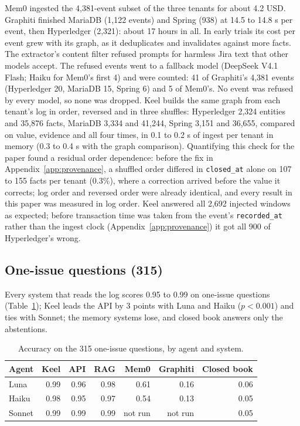 \documentclass{article}
\newcommand{\code}[1]{\texttt{#1}}
\begin{document}
Mem0 ingested the 4,381-event subset of the three tenants for about 4.2 USD. Graphiti finished MariaDB (1,122 events) and Spring (938) at 14.5 to 14.8 s per event, then Hyperledger (2,321): about 17 hours in all. In early trials its cost per event grew with its graph, as it deduplicates and invalidates against more facts. The extractor's content filter refused prompts for harmless Jira text that other models accept. The refused events went to a fallback model (DeepSeek V4.1 Flash; Haiku for Mem0's first 4) and were counted: 41 of Graphiti's 4,381 events (Hyperledger 20, MariaDB 15, Spring 6) and 5 of Mem0's. No event was refused by every model, so none was dropped. Keel builds the same graph from each tenant's log in order, reversed and in three shuffles: Hyperledger 2,324 entities and 35,876 facts, MariaDB 3,334 and 41,244, Spring 3,151 and 36,655, compared on value, evidence and all four times, in 0.1 to 0.2 s of ingest per tenant in memory (0.3 to 0.4 s with the graph comparison). Quantifying this check for the paper found a residual order dependence: before the fix in Appendix~\ref{app:provenance}, a shuffled order differed in \code{closed\_at} alone on 107 to 155 facts per tenant (0.3\%), where a correction arrived before the value it corrects; log order and reversed order were already identical, and every result in this paper was measured in log order. Keel answered all 2,692 injected windows as expected; before transaction time was taken from the event's \code{recorded\_at} rather than the ingest clock (Appendix~\ref{app:provenance}) it got all 900 of Hyperledger's wrong.

\subsection{One-issue questions (315)}
\label{sec:oneissue}

Every system that reads the log scores 0.95 to 0.99 on one-issue questions (Table~\ref{tab:oneissue}); Keel leads the API by 3 points with Luna and Haiku ($p < 0.001$) and ties with Sonnet; the memory systems lose, and closed book answers only the abstentions.

\begin{table}[htbp]
\caption{Accuracy on the 315 one-issue questions, by agent and system.}
\label{tab:oneissue}
\centering
\small
\begin{tabular}{l r r r r r r}
\toprule
Agent & Keel & API & RAG & Mem0 & Graphiti & Closed book \\
\midrule
Luna & 0.99 & 0.96 & 0.98 & 0.61 & 0.16 & 0.06 \\
Haiku & 0.98 & 0.95 & 0.97 & 0.54 & 0.13 & 0.05 \\
Sonnet & 0.99 & 0.99 & 0.99 & not run & not run & 0.05 \\
\bottomrule
\end{tabular}
\end{table}
\end{document}
